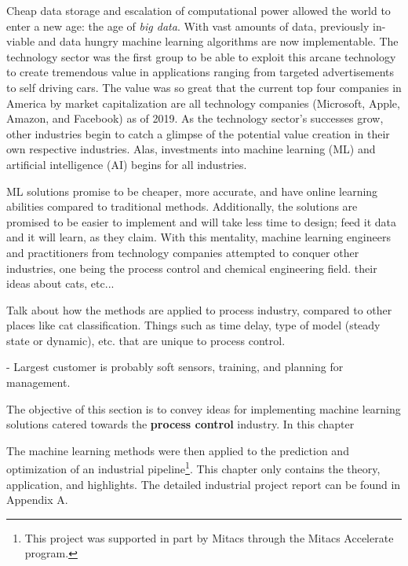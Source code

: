 %
% 

Cheap data storage and escalation of computational power allowed the world to enter a new age: the age of \textit{big data}. With vast amounts of data, previously in-viable and data hungry machine learning algorithms are now implementable.  The technology sector was the first group to be able to exploit this arcane technology to create tremendous value in applications ranging from targeted advertisements to self driving cars. The value was so great that the current top four companies in America by market capitalization are all technology companies (Microsoft, Apple, Amazon, and Facebook) as of 2019. As the technology sector's successes grow, other industries begin to catch a glimpse of the potential value creation in their own respective industries.  Alas, investments into machine learning (ML) and artificial intelligence (AI) begins for all industries.

ML solutions promise to be cheaper, more accurate, and have online learning abilities compared to traditional methods.  Additionally, the solutions are promised to be easier to implement and will take less time to design; feed it data and it will learn, as they claim.  With this mentality, machine learning engineers and practitioners from technology companies attempted to conquer other industries, one being the process control and chemical engineering field. their ideas about cats, etc...

Talk about how the methods are applied to process industry, compared to other places like cat classification.  Things such as time delay, type of model (steady state or dynamic), etc. that are unique to process control.

- Largest customer is probably soft sensors, training, and planning for management.

The objective of this section is to convey ideas for implementing machine learning solutions catered towards the \textbf{process control} industry.  In this chapter

The machine learning methods were then applied to the prediction and optimization of an industrial pipeline\footnote{This project was supported in part by Mitacs through the Mitacs Accelerate program.}. This chapter only contains the theory, application, and highlights. The detailed industrial project report can be found in Appendix A.

